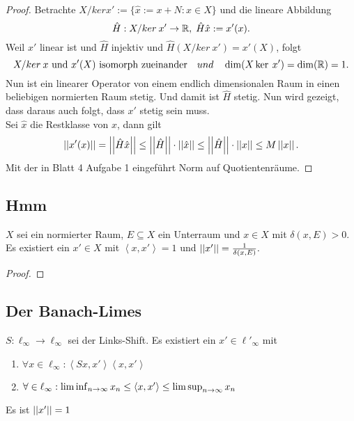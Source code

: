 \documentclass[FunkAnaskriptSS2017.tex]{subfiles}
\begin{document}
	\begin{proof}
		Betrachte $ X/ker x':= \{ \hat{x} := x + N: x\in X\} $ und die lineare Abbildung
			$$ \hat{H} : X/ker \:x' \to \mathbb{R}, \; \hat{H}\hat{x} := x'(x).$$
		Weil $x'$ linear ist und $\hat{H}$ injektiv und $\hat{H}(X/ker\: x') = x'(X)$, folgt
			$$X/ker\:x \text{ und } x'(X) \text{ isomorph zueinander} \quad und \quad \dim(X\ker \:x') = \dim(\mathbb{R}) = 1.$$ 
	Nun ist ein linearer Operator von einem endlich dimensionalen Raum in einen beliebigen normierten Raum stetig. Und damit ist $\hat{H}$ stetig. Nun wird gezeigt, dass daraus auch folgt, dass $x'$ stetig sein muss.\\
	Sei $\hat{x}$ die Restklasse von $x$, dann gilt 
		$$\left\lvert \left\lvert x'(x) \right\rvert \right\rvert = \left\lvert \left\lvert \hat{H}\hat{x} \right\rvert \right\rvert \leq \left\lvert \left\lvert \hat{H} \right\rvert \right\rvert \cdot \left\lvert \left\lvert \hat{x} \right\rvert \right\rvert \leq \left\lvert \left\lvert \hat{H} \right\rvert \right\rvert \cdot \left\lvert \left\lvert {x} \right\rvert \right\rvert \leq M \left\lvert \left\lvert x \right\rvert \right\rvert. $$ 
	Mit der in Blatt 4 Aufgabe 1 eingeführt Norm auf Quotientenräume.	
	\end{proof}
	


\subsection{ Hmm}
\label{B8.2}
	$X$ sei ein normierter Raum, $E\subseteq X$ ein Unterraum und $x\in X$ mit $\delta(x,E) > 0$. \\
	Es existiert ein $x'\in X$ mit $\left \langle x,x' \right \rangle = 1$ und $\left\lvert \left\lvert  x'  \right\rvert \right\rvert = \frac{1}{\delta(x,E)}.$
	
	\begin{proof}
	
	\end{proof}

\subsection{ Der Banach-Limes}
\label{B8.3}
	$S: \ell_\infty \to \ell_\infty$ sei der Links-Shift. Es existiert ein $x' \in \ell'_\infty$ mit
	\begin{enumerate}
		\item $\forall x \in \ell_\infty : \left \langle Sx, x' \right  \rangle \left \langle x,x' \right \rangle$
		\item $\forall \in \ell_\infty : \liminf_{n \to \infty} x_n \leq \left \langle x,x' \right \rangle \leq \limsup_{n\to\infty} x_n$
	\end{enumerate}
	Es ist $\left\lvert \left\lvert x' \right\rvert \right\rvert = 1$
	
	
\end{document}
